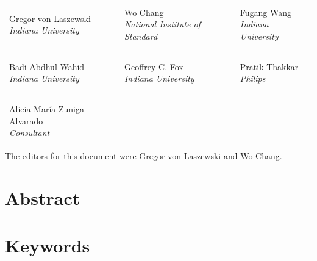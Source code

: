 \begin{center}
\parindent0pt 
\begin{tabular}{p{}p{}p{}}
 \makecell[l]{Gregor von Laszewski\\{\it Indiana University}} &
 \makecell[l]{Wo Chang\\{\it National Institute of Standard}} &
 \makecell[l]{Fugang Wang\\{\it Indiana University}}  \\
\multicolumn{3}{c}{~} \\
 \makecell[l]{Badi Abdhul Wahid\\{\it Indiana University}} & 
 \makecell[l]{Geoffrey C. Fox\\{\it Indiana University}} &
 \makecell[l]{Pratik Thakkar\\{\it Philips}} \\
\multicolumn{3}{c}{~} \\
 \makecell[l]{Alicia María Zuniga-Alvarado\\{\it Consultant}} &
 \makecell[l]{~\\~} & 
 \makecell[l]{~\\~} \\
\end{tabular}
\end{center}

\parindent0pt The editors for this document were Gregor von Laszewski and Wo Chang.

\newpage

\section*{\hfil \hspace{4cm} Abstract \hfil}
\ABSTRACT

\section*{\hfil  \hspace{4cm} Keywords \hfil}
\KEYWORDS

\newpage



\newpage

\nocite{*}




\newpage

\tableofcontents

\listoffigures
 
